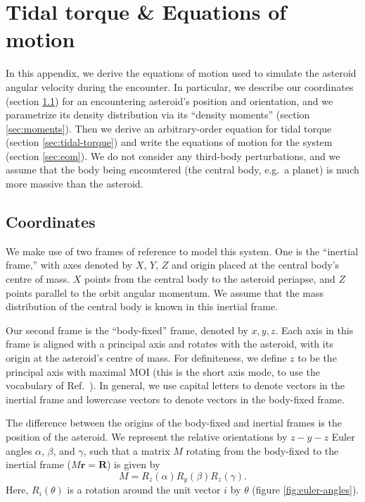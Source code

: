 


\appendix

\section{Tidal torque \& Equations of motion}
\label{app:eom}

In this appendix, we derive the equations of motion used to simulate the asteroid angular velocity during the encounter. In particular, we describe our coordinates (section \ref{sec:coordinates}) for an encountering asteroid's position and orientation, and we parametrize its density distribution via its ``density moments'' (section \ref{sec:moments}). Then we derive an arbitrary-order equation for tidal torque (section \ref{sec:tidal-torque}) and write the equations of motion for the system (section \ref{sec:eom}). We do not consider any third-body perturbations, and we assume that the body being encountered (the central body, e.g.~a planet) is much more massive than the asteroid.

\subsection{Coordinates}
\label{sec:coordinates}

We make use of two frames of reference to model this system. One is the ``inertial frame,'' with axes denoted by $\unit{X}$, $\unit{Y}$, $\unit{Z}$ and origin placed at the central body's centre of mass. $\unit{X}$ points from the central body to the asteroid periapse, and $\unit{Z}$ points parallel to the orbit angular momentum. We assume that the mass distribution of the central body is known in this inertial frame.

Our second frame is the ``body-fixed'' frame, denoted by $\unit{x}, \unit{y}, \unit{z}$. Each axis in this frame is aligned with a principal axis and rotates with the asteroid, with its origin at the asteroid's centre of mass. For definiteness, we define $\unit{z}$ to be the principal axis with maximal MOI (this is the short axis mode, to use the vocabulary of Ref.~\cite{kaasalainen2001interpretation}). In general, we use capital letters to denote vectors in the inertial frame and lowercase vectors to denote vectors in the body-fixed frame.

The difference between the origins of the body-fixed and inertial frames is the position of the asteroid. We represent the relative orientations by $z-y-z$ Euler angles $\alpha$, $\beta$, and $\gamma$, such that a matrix $M$ rotating from the body-fixed to the inertial frame ($M\bm{r} = \bm{R}$) is given by
\begin{equation}
M = R_z(\alpha) R_y(\beta) R_z(\gamma).
\label{eqn:euler-angles}
\end{equation}
Here, $R_i(\theta)$ is a rotation around the unit vector $i$ by $\theta$ (figure \ref{fig:euler-angles}).

